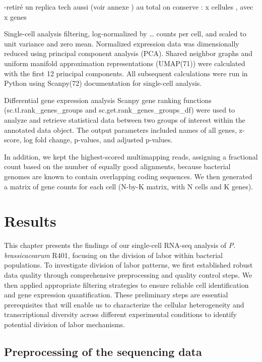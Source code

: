 \documentclass[
  11pt,
  a4paper,
]{report}
\begin{document}
-retiré un replica tech aussi (voir annexe ) au total on conserve : x
cellules , avec x genes

Single-cell analysis filtering, log-normalized by \ldots{} counts per
cell, and scaled to unit variance and zero mean. Normalized expression
data was dimensionally reduced using principal component analysis (PCA).
Shared neighbor graphs and uniform manifold approximation
representations (UMAP(71)) were calculated with the first 12 principal
components. All subsequent calculations were run in Python using
Scanpy(72) documentation for single-cell analysis.

Differential gene expression analysis Scanpy gene ranking functions
(sc.tl.rank\_genes\_groups and sc.get.rank\_genes\_groups\_df) were used
to analyze and retrieve statistical data between two groups of interest
within the annotated data object. The output parameters included names
of all genes, z-score, log fold change, p-values, and adjusted p-values.

In addition, we kept the highest-scored multimapping reads, assigning a
fractional count based on the number of equally good alignments, because
bacterial genomes are known to contain overlapping coding sequences. We
then generated a matrix of gene counts for each cell (N-by-K matrix,
with N cells and K genes).


\chapter{Results}\label{results}

This chapter presents the findings of our single-cell RNA-seq analysis
of \emph{P. brassicacearum} R401, focusing on the division of labor
within bacterial populations. To investigate division of labor patterns,
we first established robust data quality through comprehensive
preprocessing and quality control steps. We then applied appropriate
filtering strategies to ensure reliable cell identification and gene
expression quantification. These preliminary steps are essential
prerequisites that will enable us to characterize the cellular
heterogeneity and transcriptional diversity across different
experimental conditions to identify potential division of labor
mechanisms.

\section{Preprocessing of the sequencing
data}\label{preprocessing-of-the-sequencing-data-1}
\end{document}
